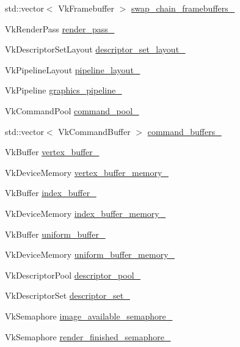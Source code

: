 \begin{DoxyCompactItemize}
std\+::vector$<$ Vk\+Framebuffer $>$ \mbox{\hyperlink{classvulkan__application_a16194c6e60f79f3e455afd39d8ee01f6}{swap\+\_\+chain\+\_\+framebuffers\+\_\+}}
\item 
Vk\+Render\+Pass \mbox{\hyperlink{classvulkan__application_a1886de8ac493fca76ca2cf91b29795e6}{render\+\_\+pass\+\_\+}}
\item 
Vk\+Descriptor\+Set\+Layout \mbox{\hyperlink{classvulkan__application_a661247bb5ae08dabadccc2f03644e45b}{descriptor\+\_\+set\+\_\+layout\+\_\+}}
\item 
Vk\+Pipeline\+Layout \mbox{\hyperlink{classvulkan__application_a1c0aeeab90c543c4ad36ca9613053412}{pipeline\+\_\+layout\+\_\+}}
\item 
Vk\+Pipeline \mbox{\hyperlink{classvulkan__application_a4709e265b16ee01a6e53bf4e4c0055be}{graphics\+\_\+pipeline\+\_\+}}
\item 
Vk\+Command\+Pool \mbox{\hyperlink{classvulkan__application_a15f632f231a251df6e3b986cd7356e6d}{command\+\_\+pool\+\_\+}}
\item 
std\+::vector$<$ Vk\+Command\+Buffer $>$ \mbox{\hyperlink{classvulkan__application_afc31f050714033fdb91f9effd074fbd7}{command\+\_\+buffers\+\_\+}}
\item 
Vk\+Buffer \mbox{\hyperlink{classvulkan__application_ab4dbb1dfeff5f1808f0453b21caee32a}{vertex\+\_\+buffer\+\_\+}}
\item 
Vk\+Device\+Memory \mbox{\hyperlink{classvulkan__application_ac3d1ae7db9706875a138f3da07c5e78c}{vertex\+\_\+buffer\+\_\+memory\+\_\+}}
\item 
Vk\+Buffer \mbox{\hyperlink{classvulkan__application_a8aee36b907c294735195b3e609c995cf}{index\+\_\+buffer\+\_\+}}
\item 
Vk\+Device\+Memory \mbox{\hyperlink{classvulkan__application_a75c49696265e13861e7867385fa454e9}{index\+\_\+buffer\+\_\+memory\+\_\+}}
\item 
Vk\+Buffer \mbox{\hyperlink{classvulkan__application_a4482a98825a11fdb7775c7bf1d7cec04}{uniform\+\_\+buffer\+\_\+}}
\item 
Vk\+Device\+Memory \mbox{\hyperlink{classvulkan__application_a2c85c8c670b5929b16385ca2f6ea8f00}{uniform\+\_\+buffer\+\_\+memory\+\_\+}}
\item 
Vk\+Descriptor\+Pool \mbox{\hyperlink{classvulkan__application_a1d2b6667e0b895b94ce0d7a366403dbb}{descriptor\+\_\+pool\+\_\+}}
\item 
Vk\+Descriptor\+Set \mbox{\hyperlink{classvulkan__application_a03a9021076eedbae009b89ef4f7ce795}{descriptor\+\_\+set\+\_\+}}
\item 
Vk\+Semaphore \mbox{\hyperlink{classvulkan__application_ac0a94cf75ca2f81b95f90628298d9287}{image\+\_\+available\+\_\+semaphore\+\_\+}}
\item 
Vk\+Semaphore \mbox{\hyperlink{classvulkan__application_a44c5124568762f2c900ac144b8770356}{render\+\_\+finished\+\_\+semaphore\+\_\+}}
\end{DoxyCompactItemize}


